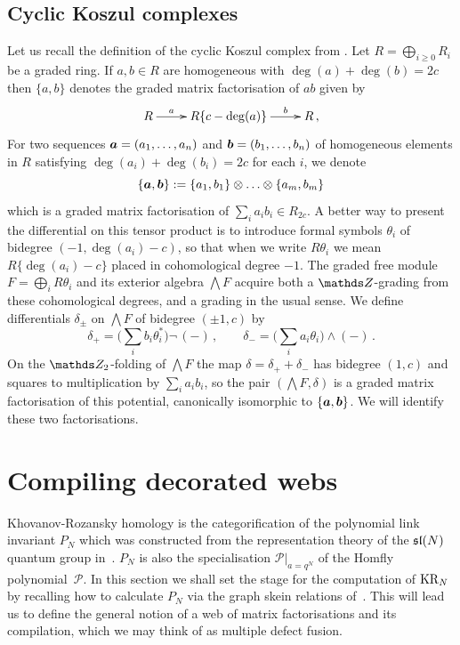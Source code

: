 \documentclass{compositio}
\theoremstyle{definition}
\numberwithin{equation}{section}
\begin{document}
\subsection{Cyclic Koszul complexes}\label{prelim:cyclic_koszul}

Let us recall the definition of the cyclic Koszul complex from \cite[Section~2]{kr0401268}. Let $R = \bigoplus_{i \ge 0} R_i$ be a graded ring. If $a,b\in R$ are homogeneous with $\deg(a) + \deg(b) = 2c$ then $\{ a, b \}$ denotes the graded matrix factorisation of $ab$ given by
\[
\xymatrix{
R \ar[r]^-{a} & R\{ c - \deg(a) \} \ar[r]^-{b} & R \, ,
}
\]
For two sequences $\boldsymbol{a} = (a_1,\ldots,a_n)$ and $\boldsymbol{b} = (b_1, \ldots, b_n)$ of homogeneous elements in $R$ satisfying $\deg(a_i) + \deg(b_i) = 2c$ for each $i$, we denote
\[
\{ \boldsymbol{a}, \boldsymbol{b} \} := \{a_1,b_1\} \otimes \ldots \otimes \{a_m, b_m\}
\]
which is a graded matrix factorisation of $\sum_i a_i b_i \in R_{2c}$. A better way to present the differential on this tensor product is to introduce formal symbols $\theta_i$ of bidegree $(-1, \deg(a_i) - c)$, so that when we write $R \theta_i$ we mean $R\{ \deg(a_i) - c \}$ placed in cohomological degree $-1$. The graded free module $F = \bigoplus_i R\theta_i$ and its exterior algebra $\bigwedge F$ acquire both a $\ZZ$-grading from these cohomological degrees, and a grading in the usual sense. We define differentials $\delta_{\pm}$ on $\bigwedge F$ of bidegree $(\pm 1,c)$ by
\[
\delta_+ = \Big(\sum_i b_i \theta_i^*\Big) \neg\, (-) \, , \qquad \delta_{-} = \Big(\sum_i a_i \theta_i\Big) \wedge (-)\,.
\]
On the $\Ztwo$-folding of $\bigwedge F$ the map $\delta = \delta_+ + \delta_-$ has bidegree $(1,c)$ and squares to multiplication by $\sum_i a_i b_i$, so the pair $(\bigwedge F, \delta)$ is a graded matrix factorisation of this potential, canonically isomorphic to $\{ \boldsymbol{a}, \boldsymbol{b} \}$. We will identify these two factorisations.


\section{Compiling decorated webs}
\label{compilewebs}

Khovanov-Rozansky homology is the categorification of the polynomial link invariant $P_{N}$ which was constructed from the representation theory of the $\mathfrak{sl}(N)$ quantum group in~\cite{RT1990}. $P_{N}$ is also the specialisation $\mathcal P|_{{a=q^N}}$ of the Homfly polynomial~$\mathcal P$. In this section we shall set the stage for the computation of $\operatorname{KR}_{N}$ by recalling how to calculate $P_{N}$ via the graph skein relations of~\cite{moy1998}. This will lead us to define the general notion of a web of matrix factorisations and its compilation, which we may think of as multiple defect fusion. 
\end{document}
